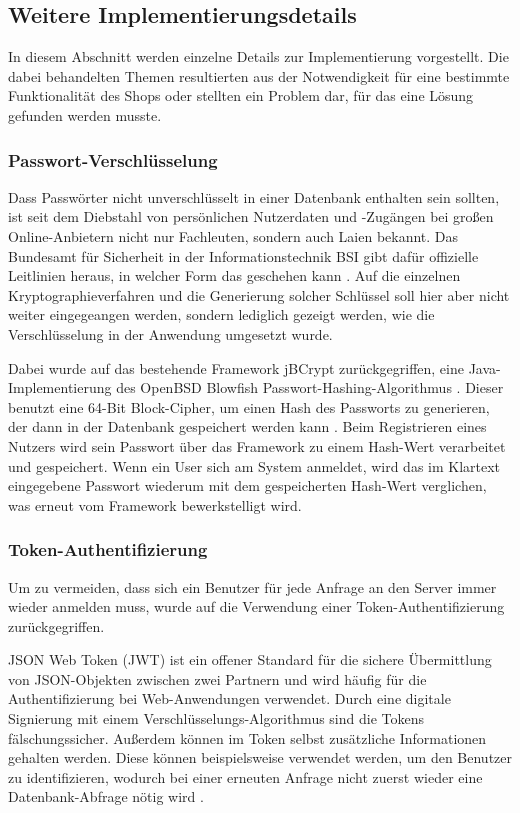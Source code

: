 \subsection{Weitere Implementierungsdetails}
In diesem Abschnitt werden einzelne Details zur Implementierung vorgestellt.
Die dabei behandelten Themen resultierten aus der Notwendigkeit für eine bestimmte Funktionalität des Shops oder stellten ein Problem dar, für das eine Lösung gefunden werden musste.

\subsubsection{Passwort-Verschlüsselung}
Dass Passwörter nicht unverschlüsselt in einer Datenbank enthalten sein sollten, ist seit dem Diebstahl von persönlichen Nutzerdaten und -Zugängen bei großen Online-Anbietern nicht nur Fachleuten, sondern auch Laien bekannt.
Das Bundesamt für Sicherheit in der Informationstechnik \acs{BSI} gibt dafür offizielle Leitlinien heraus, in welcher Form das geschehen kann \cite{BSI2016}.
Auf die einzelnen Kryptographieverfahren und die Generierung solcher Schlüssel soll hier aber nicht weiter eingegeangen werden, sondern lediglich gezeigt werden, wie die Verschlüsselung in der Anwendung umgesetzt wurde.

Dabei wurde auf das bestehende Framework jBCrypt zurückgegriffen, eine Java-Implementierung des OpenBSD Blowfish Passwort-Hashing-Algorithmus \cite{jBCrypt2015}.
Dieser benutzt eine 64-Bit Block-Cipher, um einen Hash des Passworts zu generieren, der dann in der Datenbank gespeichert werden kann \cite{Provos}.
Beim Registrieren eines Nutzers wird sein Passwort über das Framework zu einem Hash-Wert verarbeitet und gespeichert.
Wenn ein User sich am System anmeldet, wird das im Klartext eingegebene Passwort wiederum mit dem gespeicherten Hash-Wert verglichen, was erneut vom Framework bewerkstelligt wird.

\subsubsection{Token-Authentifizierung}\label{token}
Um zu vermeiden, dass sich ein Benutzer für jede Anfrage an den Server immer wieder anmelden muss, wurde auf die Verwendung einer Token-Authentifizierung zurückgegriffen.

\acs{JSON} Web Token (\acs{JWT}) ist ein offener Standard für die sichere Übermittlung von \acs{JSON}-Objekten zwischen zwei Partnern und wird häufig für die Authentifizierung bei Web-Anwendungen verwendet.
Durch eine digitale Signierung mit einem Verschlüsselungs-Algorithmus sind die Tokens fälschungssicher. Außerdem können im Token selbst zusätzliche Informationen gehalten werden.
Diese können beispielsweise verwendet werden, um den Benutzer zu identifizieren, wodurch bei einer erneuten Anfrage nicht zuerst wieder eine Datenbank-Abfrage nötig wird \cite{Auth02016}.

